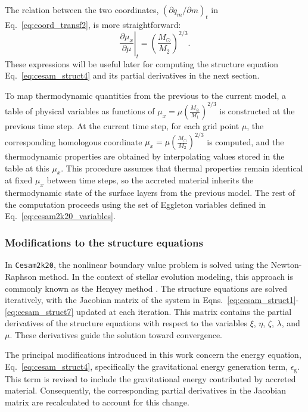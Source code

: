 \documentclass[12pt,a4paper]{article}
\newcommand{\mr}{\mathrm}
\newcommand{\pfird}[2][]{\frac{\partial#1}{\partial#2}}
\begin{document}
The relation between the two coordinates, $\left(\partial q_m/\partial m\right)_t$ in Eq.~\eqref{eq:coord_transf2}, is more straightforward:
\begin{equation}
  \left.\pfird[\mu_x]{\mu}\right|_t = \left(\frac{M_\odot}{M_2}\right)^{2/3}. 
\end{equation}
These expressions will be useful later for computing the structure equation Eq.~\eqref{eq:cesam_struct4} and its partial derivatives in the next section.

To map thermodynamic quantities from the previous to the current model, a table of physical variables as functions of $\mu_x = \mu \left(\frac{M_\odot}{M_1}\right)^{2/3}$ is constructed at the previous time step. At the current time step, for each grid point $\mu$, the corresponding homologous coordinate $\mu_x = \mu \left(\frac{M_\odot}{M_2}\right)^{2/3}$ is computed, and the thermodynamic properties are obtained by interpolating values stored in the table at this $\mu_x$. This procedure assumes that thermal properties remain identical at fixed $\mu_x$ between time steps, so the accreted material inherits the thermodynamic state of the surface layers from the previous model. The rest of the computation proceeds using the set of Eggleton variables defined in Eq.~\eqref{eq:cesam2k20_variables}.

\subsubsection{Modifications to the structure equations}
\label{sec:accretion_struct_eq}

In \texttt{Cesam2k20}, the nonlinear boundary value problem is solved using the Newton-Raphson method. In the context of stellar evolution modeling, this approach is commonly known as the Henyey method \parencite{HenyeyEtAl1959}. The structure equations are solved iteratively, with the Jacobian matrix of the system in Eqns.~\eqref{eq:cesam_struct1}-\eqref{eq:cesam_struct7} updated at each iteration. This matrix contains the partial derivatives of the structure equations with respect to the variables $\xi$, $\eta$, $\zeta$, $\lambda$, and $\mu$. These derivatives guide the solution toward convergence.

The principal modifications introduced in this work concern the energy equation, Eq.~\eqref{eq:cesam_struct4}, specifically the gravitational energy generation term, $\epsilon_\mr{g}$. This term is revised to include the gravitational energy contributed by accreted material. Consequently, the corresponding partial derivatives in the Jacobian matrix are recalculated to account for this change.
\end{document}
